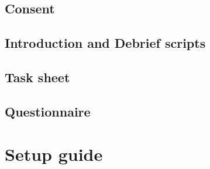 \documentclass{l4proj}
\begin{document}
\begin{appendices}
\begin{minipage}{\textwidth}
		\section{Consent}
		
	\end{minipage}
	\clearpage
	\begin{minipage}{\textwidth}
		\section{Introduction and Debrief scripts}
		
	\end{minipage}
	\clearpage
	\begin{minipage}{\textwidth}
		\section{Task sheet}
		
	\end{minipage}
	\clearpage
	\begin{minipage}{\textwidth}
		\section{Questionnaire}
		
	\end{minipage}
	\clearpage
	\begin{minipage}{\textwidth}
		\chapter{Setup guide}
		
	\end{minipage}
	
\end{appendices}
\end{document}
